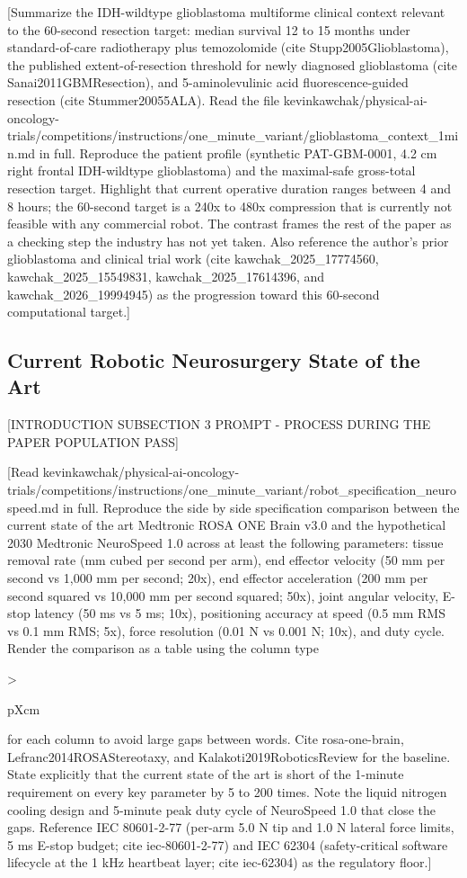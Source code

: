 [Summarize the IDH-wildtype glioblastoma multiforme clinical context
relevant to the 60-second resection target: median survival 12 to 15
months under standard-of-care radiotherapy plus temozolomide (cite
Stupp2005Glioblastoma), the published extent-of-resection threshold
for newly diagnosed glioblastoma (cite Sanai2011GBMResection), and
5-aminolevulinic acid fluorescence-guided resection (cite
Stummer20055ALA). Read the file
kevinkawchak/physical-ai-oncology-trials/competitions/instructions/one_minute_variant/glioblastoma_context_1min.md
in full. Reproduce the patient profile (synthetic PAT-GBM-0001,
4.2 cm right frontal IDH-wildtype glioblastoma) and the maximal-safe
gross-total resection target. Highlight that current operative
duration ranges between 4 and 8 hours; the 60-second target is a 240x
to 480x compression that is currently not feasible with any commercial
robot. The contrast frames the rest of the paper as a checking step
the industry has not yet taken. Also reference the author's prior
glioblastoma and clinical trial work (cite kawchak_2025_17774560,
kawchak_2025_15549831, kawchak_2025_17614396, and kawchak_2026_19994945)
as the progression toward this 60-second computational target.]

\subsection{Current Robotic Neurosurgery State of the Art}
\label{sec:intro-baseline}

[INTRODUCTION SUBSECTION 3 PROMPT - PROCESS DURING THE PAPER POPULATION PASS]

[Read
kevinkawchak/physical-ai-oncology-trials/competitions/instructions/one_minute_variant/robot_specification_neurospeed.md
in full. Reproduce the side by side specification comparison between
the current state of the art Medtronic ROSA ONE Brain v3.0 and the
hypothetical 2030 Medtronic NeuroSpeed 1.0 across at least the
following parameters: tissue removal rate (mm cubed per second per
arm), end effector velocity (50 mm per second vs 1,000 mm per second;
20x), end effector acceleration (200 mm per second squared vs 10,000
mm per second squared; 50x), joint angular velocity, E-stop latency
(50 ms vs 5 ms; 10x), positioning accuracy at speed (0.5 mm RMS vs
0.1 mm RMS; 5x), force resolution (0.01 N vs 0.001 N; 10x), and duty
cycle. Render the comparison as a table using the column type
{>{\raggedright\arraybackslash}p{Xcm}} for each column to avoid
large gaps between words. Cite rosa-one-brain, Lefranc2014ROSAStereotaxy,
and Kalakoti2019RoboticsReview for the baseline. State explicitly
that the current state of the art is short of the 1-minute requirement
on every key parameter by 5 to 200 times. Note the liquid nitrogen
cooling design and 5-minute peak duty cycle of NeuroSpeed 1.0 that
close the gaps. Reference IEC 80601-2-77 (per-arm 5.0 N tip and 1.0 N
lateral force limits, 5 ms E-stop budget; cite iec-80601-2-77) and
IEC 62304 (safety-critical software lifecycle at the 1 kHz heartbeat
layer; cite iec-62304) as the regulatory floor.]

